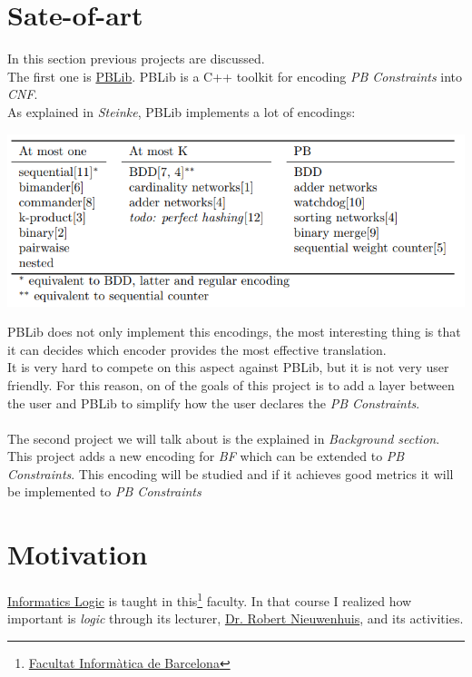\section{Sate-of-art}
In this section previous projects are discussed. \\
The first one is \href{http://tools.computational-logic.org/content/pblib.php}{PBLib}. PBLib is a C++ toolkit for encoding \emph{PB Constraints} into \emph{CNF}.\\
As explained in \emph{Steinke}\cite{Steinke2015}, PBLib implements a lot of encodings:
\begin{center}
	\includegraphics[width=1\textwidth]{Figures/PBLibEncodings.png}
\end{center}
PBLib does not only implement this encodings, the most interesting thing is that it can decides which encoder provides the most effective translation.\\
It is very hard to compete on this aspect against PBLib, but it is not very user friendly. For this reason, on of the goals of this project is to add a layer between the user and PBLib to simplify how the user declares the \emph{PB Constraints}.\\\\

The second project we will talk about is the explained in \emph{Background section}. This project adds a new encoding for \emph{BF} which can be extended to \emph{PB Constraints}. This encoding will be studied and if it achieves good metrics it will be implemented to \emph{PB Constraints}

\section{Motivation}

\href{https://www.fib.upc.edu/en/studies/bachelors-degrees/bachelor-degree-informatics-engineering/curriculum/syllabus/LI}{Informatics Logic} is taught in this\footnote{\href{https://www.fib.upc.edu/en/}{Facultat Informàtica de Barcelona}} faculty. In that course I realized how important is \emph{logic} through its lecturer, \href{http://www.lsi.upc.es/~roberto/}{Dr. Robert Nieuwenhuis}, and its activities. \\

